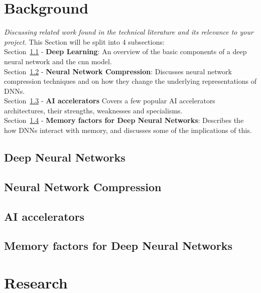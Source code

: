\documentclass[11pt]{article}
\begin{document}
\section{Background}
\emph{Discussing related work found in the technical literature and its relevance to your project.}
This Section will be split into 4 subsections:\\
Section~\ref{subsec:deepLearning} - \textbf{Deep Learning}: An overview of the basic components of a deep neural network and the \acrshort{cnn} model.\\
Section~\ref{subsec:compressionTypes} - \textbf{Neural Network Compression}: Discusses neural network compression techniques and on how they change the underlying representations of DNNs.\\
Section~\ref{subsec:AIaccelerators} - \textbf{AI accelerators} Covers a few popular AI accelerators architectures, their strengths, weaknesses and specialisms.\\
Section~\ref{subsec:hardwareArch} - \textbf{Memory factors for Deep Neural Networks}: Describes the how DNNs interact with memory, and discusses some of the implications of this.

\subsection{Deep Neural Networks}\label{subsec:deepLearning}


\newpage
\subsection{Neural Network Compression}\label{subsec:compressionTypes}


\newpage
\subsection{AI accelerators}\label{subsec:AIaccelerators}


\subsection{Memory factors for Deep Neural Networks}\label{subsec:hardwareArch}


\pagebreak
\section{Research}

\end{document}
